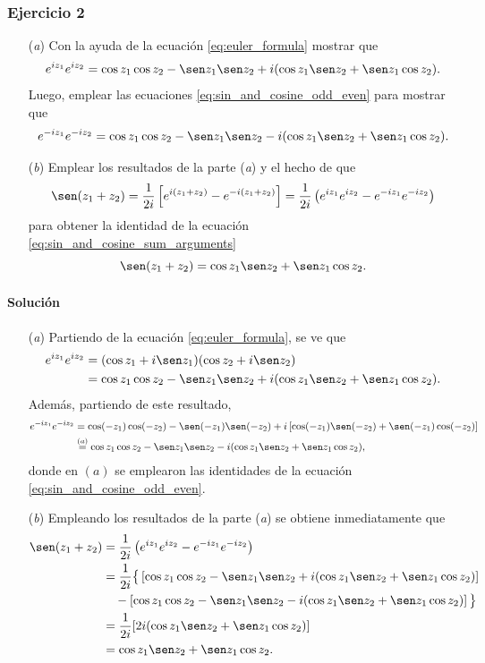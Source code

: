 \documentclass[a4paper]{report}
\begin{document}
\subsubsection{Ejercicio 2}

\begin{enumerate}
 \item[(\textit{a})] Con la ayuda de la ecuación \ref{eq:euler_formula} mostrar que 
 \[
  e^{iz_1}e^{iz_2}=\cos z_1\cos z_2-\sen z_1\sen z_2+i(\cos z_1\sen z_2+\sen z_1\cos z_2).
 \]
 Luego, emplear las ecuaciones \ref{eq:sin_and_cosine_odd_even} para mostrar que 
 \[
  e^{-iz_1}e^{-iz_2}=\cos z_1\cos z_2-\sen z_1\sen z_2-i(\cos z_1\sen z_2+\sen z_1\cos z_2).
 \]
 \item[(\textit{b})] Emplear los resultados de la parte (\textit{a}) y el hecho de que 
 \[
  \sen(z_1+z_2)=\frac{1}{2i}\left[e^{i(z_1+z_2)}-e^{-i(z_1+z_2)}\right]
  =\frac{1}{2i}\left(e^{iz_1}e^{iz_2}-e^{-iz_1}e^{-iz_2}\right)
 \]
 para obtener la identidad de la ecuación \ref{eq:sin_and_cosine_sum_arguments}
 \[
  \sen(z_1+z_2)=\cos z_1\sen z_2+\sen z_1\cos z_2.
 \]
\end{enumerate}

\paragraph{Solución} 

\begin{enumerate}
 \item[(\textit{a})] Partiendo de la ecuación \ref{eq:euler_formula}, se ve que 
 \begin{align*}
  e^{iz_1}e^{iz_2}&=(\cos z_1+i\sen z_1)(\cos z_2+i\sen z_2)\\
   &=\cos z_1\cos z_2-\sen z_1\sen z_2+i(\cos z_1\sen z_2+\sen z_1\cos z_2).
 \end{align*}
 Además, partiendo de este resultado,
 \begin{align*}
  e^{-iz_1}e^{-iz_2}&=\cos(-z_1)\cos(-z_2)-\sen(-z_1)\sen(-z_2)+i\left[\cos(-z_1)\sen(-z_2)+\sen(-z_1)\cos(-z_2)\right]\\
   &\overset{(a)}{=}\cos z_1\cos z_2-\sen z_1\sen z_2-i(\cos z_1\sen z_2+\sen z_1\cos z_2),
 \end{align*}
 donde en \((a)\) se emplearon las identidades de la ecuación \ref{eq:sin_and_cosine_odd_even}.
 \item[(\textit{b})] Empleando los resultados de la parte (\textit{a}) se obtiene inmediatamente que 
 \begin{align*}
   \sen(z_1+z_2)&=\frac{1}{2i}\left(e^{iz_1}e^{iz_2}-e^{-iz_1}e^{-iz_2}\right)\\
     &=\frac{1}{2i}\big\{\left[\cos z_1\cos z_2-\sen z_1\sen z_2+i(\cos z_1\sen z_2+\sen z_1\cos z_2)\right]\\
     &\quad-\left[\cos z_1\cos z_2-\sen z_1\sen z_2-i(\cos z_1\sen z_2+\sen z_1\cos z_2)\right]\big\}\\
     &=\frac{1}{2i}[2i(\cos z_1\sen z_2+\sen z_1\cos z_2)]\\
     &=\cos z_1\sen z_2+\sen z_1\cos z_2.
 \end{align*}
\end{enumerate} 
\end{document}
